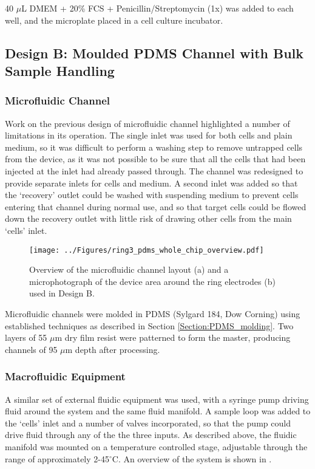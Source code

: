 40 $\mu$L DMEM + 20\% FCS + Penicillin/Streptomycin (1x) was added to each well, and the microplate placed in a cell culture incubator. 


\subsection{Design B: Moulded PDMS Channel with Bulk Sample Handling}

\subsubsection{Microfluidic Channel}

Work on the previous design of microfluidic channel highlighted a number of limitations in its operation. The single inlet was used for both cells and plain medium, so it was difficult to perform a washing step to remove untrapped cells from the device, as it was not possible to be sure that all the cells that had been injected at the inlet had already passed through. The channel was redesigned to provide separate inlets for cells and medium. A second inlet was added so that the `recovery' outlet could be washed with suspending medium to prevent cells entering that channel during normal use, and so that target cells could be flowed down the recovery outlet with little risk of drawing other cells from the main `cells' inlet.

\begin{figure}
	\centering
		\texttt{[image: ../Figures/ring3\_pdms\_whole\_chip\_overview.pdf]}
	\caption[Overview of the moulded PDMS microfluidic channel.]{Overview of the microfluidic channel layout (a) and a microphotograph of the device area around the ring electrodes (b) used in Design B.}
	\label{fig:ring3_pdms_whole_chip_overview}
\end{figure}

Microfluidic channels were molded in PDMS (Sylgard 184, Dow Corning) using established techniques as described in Section \ref{Section:PDMS_molding}. Two layers of 55 $\mu$m dry film resist were patterned to form the master, producing channels of 95 $\mu$m depth after processing.

\subsubsection{Macrofluidic Equipment}
A similar set of external fluidic equipment was used, with a syringe pump driving fluid around the system and the same fluid manifold. A sample loop was added to the `cells' inlet and a number of valves incorporated, so that the pump could drive fluid through any of the the three inputs. As described above, the fluidic manifold was mounted on a temperature controlled stage, adjustable through the range of approximately 2-45$^\circ$C. An overview of the system is shown in .

